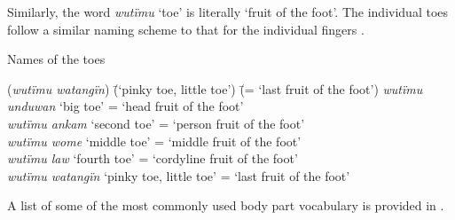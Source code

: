 Similarly, the word \textit{wutïmu} ‘toe’ is literally ‘fruit of the foot’. The individual toes follow a similar naming scheme to that for the individual fingers .

\newpage

\ea%
    \label{ex:sem:20}
          Names of the toes
\begin{tabbing}
{(\textit{wutïmu watangïn})} \= {(‘pinky toe, little toe’)} \= {(= ‘last fruit of the foot’)}\kill
{\textit{wutïmu unduwan}} \> {‘big toe’} \> {= ‘head fruit of the foot’}\\
{\textit{wutïmu ankam}} \> {‘second toe’} \> {= ‘person fruit of the foot’}\\
{\textit{wutïmu wome}} \> {‘middle toe’} \> {= ‘middle fruit of the foot’}\\
{\textit{wutïmu law}} \> {‘fourth toe’} \> {= ‘cordyline fruit of the foot’}\\
{\textit{wutïmu watangïn}} \> {‘pinky toe, little toe’} \> {= ‘last fruit of the foot’}
\end{tabbing}
\z

A list of some of the most commonly used body part vocabulary is provided in .

